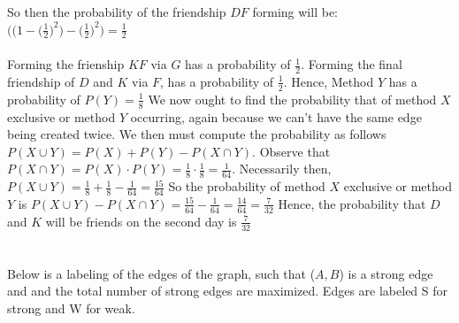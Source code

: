 \documentclass[12pt]{article}
\begin{document}
So then the probability of the friendship $DF$ forming will be: $\big ( \big ( 1 - \big (
  \frac{1}{2} \big )^2 \big ) - \big ( \frac{1}{2} \big )^2
  \big ) = \frac{1}{2}$
\\ 
\\ 
Forming the frienship $KF$ via $G$ has a probability of $\frac{1}{2}$. Forming the final friendship of $D$ and $K$ via $F$, has a probability of $\frac{1}{2}$. Hence, Method $Y$ has a probability of $P(Y) = \frac{1}{8}$
\newline 
\newline 
We now ought to find the probability that of method $X$ exclusive or method $Y$ occurring, again because we can't have the same edge being created twice. We then must compute the probability as follows $P(X \cup Y) = P(X) + P(Y) - P(X \cap Y)$. Observe that $P(X \cap Y) = P(X) \cdot P(Y) = \frac{1}{8} \cdot \frac{1}{8} = \frac{1}{64}$. 
\newline 
\newline 
Necessarily then, $P(X \cup Y) = \frac{1}{8} + \frac{1}{8} - \frac{1}{64} = \frac{15}{64}$
\newline 
\newline 
So the probability of method $X$ exclusive or method $Y$ is $P(X \cup Y) - P(X \cap Y) = \frac{15}{64} - \frac{1}{64} = \frac{14}{64} = \frac{7}{32}$
\newline 
\newline 
Hence, the probability that $D$ and $K$ will be friends on the second day is $\frac{7}{32}$

 
\newpage
\section{}
\subsection{}
Below is a labeling of the edges of the graph, such that ($A,B$) is a strong edge and and the total number of strong edges are maximized. Edges are labeled S for strong and W for weak.  
\newline 
\newline 
{}
\end{document}

